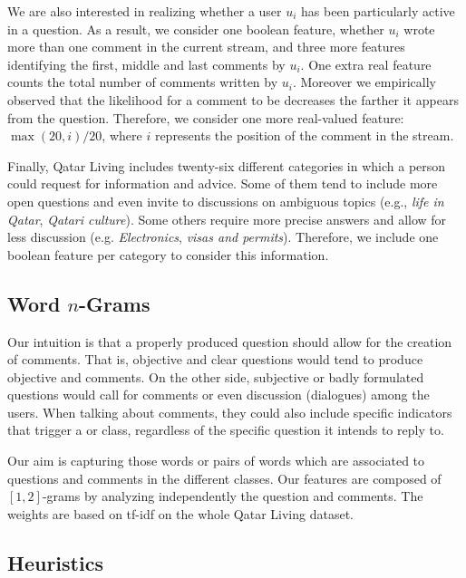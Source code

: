 We are also interested in realizing whether a user $u_i$ has been particularly 
active in a question. As a result, we consider one boolean feature, whether 
$u_i$ wrote more than one comment in the current stream, and three more features 
identifying the first, middle and last comments by $u_i$. One extra real feature 
counts the total number of comments written by $u_i$. Moreover we empirically 
observed that the likelihood for a comment to be \good decreases 
the farther it appears from the question. Therefore, we consider one more 
real-valued feature: $\max(20, i)/20$, where $i$ represents the position of 
the comment in the stream.

Finally, Qatar Living includes twenty-six different categories in which a person 
could 
request for information and advice. Some of them tend to include more open 
questions and even invite to discussions on ambiguous topics (e.g., \textit{life 
in Qatar}, \textit{Qatari culture}). Some others require more precise answers 
and allow for less discussion (e.g. \textit{Electronics}, \textit{visas and 
permits}). Therefore, we include one boolean feature per category to consider 
this information. 
 



\subsection{Word $n$-Grams}
\label{ssub:ngrams}

Our intuition is that a properly produced question should allow for the creation 
of \good comments. That is, objective and clear questions would tend to produce 
objective and \good comments. On the other side, subjective or badly formulated 
questions would call for \bad comments or even discussion (\ie dialogues) among 
the users. When talking about comments, they could also include 
specific indicators that trigger a \good or \bad class, regardless of the 
specific question it intends to reply to. 

Our aim is capturing those words or pairs of words which are associated to 
questions and comments in the different classes. Our features are composed of 
$[1,2]$-grams by analyzing independently the question and comments. The weights 
are based on tf-idf on the whole Qatar Living dataset. 

\subsection{Heuristics}
\label{ssub:heuristics}

